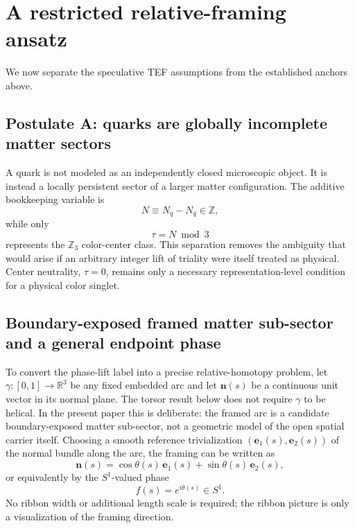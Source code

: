 \documentclass[aps,prd,reprint,superscriptaddress,nofootinbib,longbibliography,floatfix]{revtex4-2}
\begin{document}
\section{A restricted relative-framing ansatz}
\label{sec:ansatz}

We now separate the speculative TEF assumptions from the established anchors above.

\subsection{Postulate A: quarks are globally incomplete matter sectors}

A quark is not modeled as an independently closed microscopic object. It is instead a locally persistent sector of a larger matter configuration. The additive bookkeeping variable is
\begin{equation}
N\equiv N_q-N_{\bar q}\in\mathbb Z,
\label{eq:Ndef}
\end{equation}
while only
\begin{equation}
\tau=N\bmod3
\label{eq:taumod}
\end{equation}
represents the $\mathbb Z_3$ color-center class. This separation removes the ambiguity that would arise if an arbitrary integer lift of triality were itself treated as physical. Center neutrality, $\tau=0$, remains only a necessary representation-level condition for a physical color singlet.

\subsection{Boundary-exposed framed matter sub-sector and a general endpoint phase}

To convert the phase-lift label into a precise relative-homotopy problem, let $\gamma:[0,1]\to\mathbb R^3$ be any fixed embedded arc and let $\mathbf n(s)$ be a continuous unit vector in its normal plane. The torsor result below does not require $\gamma$ to be helical. In the present paper this is deliberate: the framed arc is a candidate boundary-exposed matter sub-sector, not a geometric model of the open spatial carrier itself. Choosing a smooth reference trivialization $(\mathbf e_1(s),\mathbf e_2(s))$ of the normal bundle along the arc, the framing can be written as
\begin{equation}
\mathbf n(s)=\cos\theta(s)\,\mathbf e_1(s)+\sin\theta(s)\,\mathbf e_2(s),
\label{eq:framingvector}
\end{equation}
or equivalently by the $S^1$-valued phase
\begin{equation}
f(s)=e^{i\theta(s)}\in S^1.
\label{eq:framingphase}
\end{equation}
No ribbon width or additional length scale is required; the ribbon picture is only a visualization of the framing direction.
\end{document}
